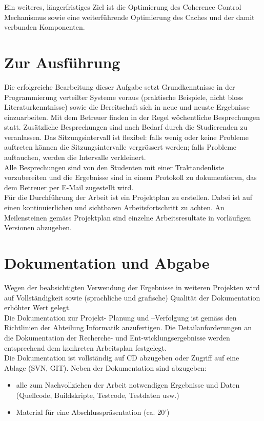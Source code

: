 \documentclass{article}
\begin{document}
Ein weiteres, längerfristiges Ziel ist die Optimierung des Coherence Control Mechanismus sowie eine weiterführende Optimierung des Caches und der damit verbunden Komponenten.

\section{Zur Ausführung}
Die erfolgreiche Bearbeitung dieser Aufgabe setzt Grundkenntnisse in der Programmierung verteilter Systeme voraus (praktische Beispiele, nicht bloss Literaturkenntnisse) sowie die Bereitschaft sich in neue und neuste Ergebnisse einzuarbeiten.
Mit dem Betreuer finden in der Regel wöchentliche Besprechungen statt. Zusätzliche Besprechungen sind nach Bedarf durch die Studierenden zu veranlassen. Das Sitzungsintervall ist flexibel: falls wenig oder keine Probleme auftreten können die Sitzungsintervalle vergrössert werden; falls Probleme auftauchen, werden die Intervalle verkleinert.\\
Alle Besprechungen sind von den Studenten mit einer Traktandenliste vorzubereiten und die Ergebnisse sind in einem Protokoll zu dokumentieren, das dem Betreuer per E-Mail zugestellt wird.\\
Für die Durchführung der Arbeit ist ein Projektplan zu erstellen. Dabei ist auf einen kontinuierlichen und sichtbaren Arbeitsfortschritt zu achten. An Meilensteinen gemäss Projektplan sind einzelne Arbeitsresultate in vorläufigen Versionen abzugeben. 
\section{Dokumentation und Abgabe}
Wegen der beabsichtigten Verwendung der Ergebnisse in weiteren Projekten wird auf Vollständigkeit sowie (sprachliche und grafische) Qualität der Dokumentation erhöhter Wert gelegt.\\
Die Dokumentation zur Projekt- Planung und –Verfolgung ist gemäss den Richtlinien der Abteilung Informatik anzufertigen. Die Detailanforderungen an die Dokumentation der Recherche- und Ent-wicklungsergebnisse werden entsprechend dem konkreten Arbeitsplan festgelegt.\\
Die Dokumentation ist vollständig auf CD abzugeben oder Zugriff auf eine Ablage (SVN, GIT).
Neben der Dokumentation sind abzugeben:
\begin{itemize}
\item alle zum Nachvollziehen der Arbeit notwendigen Ergebnisse und Daten (Quellcode, Buildskripte, Testcode, Testdaten usw.)
\item Material für eine Abschlusspräsentation (ca. 20’)
\end{itemize}
\end{document}
